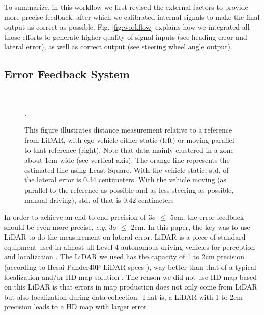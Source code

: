 \documentclass[letterpaper, 10 pt, conference]{ieeeconf}
\begin{document}
To summarize, in this workflow we first revised the external factors to provide more precise feedback, after which we calibrated internal signals to make the final output as correct as possible. Fig. \ref{fig:workflow} explains how we integrated all those efforts to generate higher quality of signal inputs (see heading error and lateral error), as well as correct output (see steering wheel angle output).

\subsection{Error Feedback System}
\begin{figure*}[thpb!]
\vspace{-0.cm}
\small
\centering
     \\    
  \caption{This figure illustrates distance measurement relative to a reference from LiDAR, with ego vehicle either static (left) or moving parallel to that reference (right). Note that data mainly clustered in a zone about 1cm wide (see vertical axis). The orange line represents the estimated line using Least Square. With the vehicle static, std. of the lateral error is 0.34 centimeters. With the vehicle moving (as parallel to the reference as possible and as less steering as possible, manual driving), std. of that is 0.42 centimeters}.
  \label{fig:distance_measure}
  \scriptsize{}
\end{figure*}
In order to achieve an end-to-end precision of 3$\sigma$ $\leq$ 5cm, the error feedback should be even more precise, \textit{e.g.} 3$\sigma$ $\leq$ 2cm.
In this paper, the key was to use LiDAR to do the measurement on lateral error. LiDAR is a piece of standard equipment used in almost all Level-4 autonomous driving vehicles for perception and localization \cite{Levinson2011Towards}. 
The LiDAR we used has the capacity of 1 to 2cm precision (according to Hesai Pander40P LiDAR specs \cite{Hesai40P}), way better than that of a typical localization and/or HD map solution \cite{2019L, Zhou2020DA4AD, 8461224}. The reason we did not use HD map based on this LiDAR is that errors in map production does not only come from LiDAR but also localization during data collection. That is, a LiDAR with 1 to 2cm precision leads to a HD map with larger error. 
\end{document}
